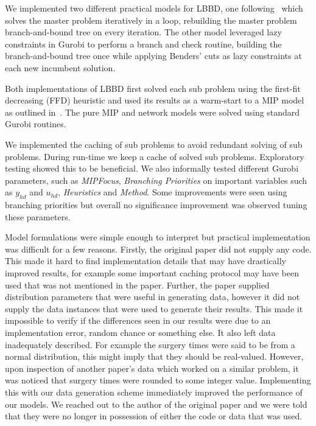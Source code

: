 We implemented two different practical models for LBBD, one following~\cite{roshanaei2017propagating} which solves the master problem iteratively in a loop, rebuilding the master problem branch-and-bound tree on every iteration. The other model leveraged lazy constraints in Gurobi to perform a branch and check routine\cite{LBBDBible}, building the branch-and-bound tree once while applying Benders' cuts as lazy constraints at each new incumbent solution. 

Both implementations of LBBD first solved each sub problem using the first-fit decreasing (FFD) heuristic\cite{Fazel} and used its results as a warm-start to a MIP model as outlined in~\cite{roshanaei2017propagating}. The pure MIP and network models were solved using standard Gurobi routines. 

We implemented the caching of sub problems to avoid redundant solving of sub problems. During run-time we keep a cache of solved sub problems. Exploratory testing showed this to be beneficial. We also informally tested different Gurobi parameters, such as \textit{MIPFocus}, \textit{Branching Priorities} on important variables such as $y_{hd}$ and $u_{hd}$, \textit{Heuristics} and \textit{Method}. Some improvements were seen using branching priorities but overall no significance improvement was observed tuning these parameters. 

Model formulations were simple enough to interpret but practical implementation was difficult for a few reasons. Firstly, the original paper did not supply any code. This made it hard to find implementation details that may have drastically improved results, for example some important caching protocol may have been used that was not mentioned in the paper. Further, the paper supplied distribution parameters that were useful in generating data, however it did not supply the data instances that were used to generate their results. This made it impossible to verify if the differences seen in our results were due to an implementation error, random chance or something else. It also left data inadequately described. For example the surgery times were said to be from a normal distribution, this might imply that they should be real-valued. However, upon inspection of another paper's data which worked on a similar problem\cite{guo}, it was noticed that surgery times were rounded to some integer value. Implementing this with our data generation scheme immediately improved the performance of our models. We reached out to the author of the original paper and we were told that they were no longer in possession of either the code or data that was used. 

